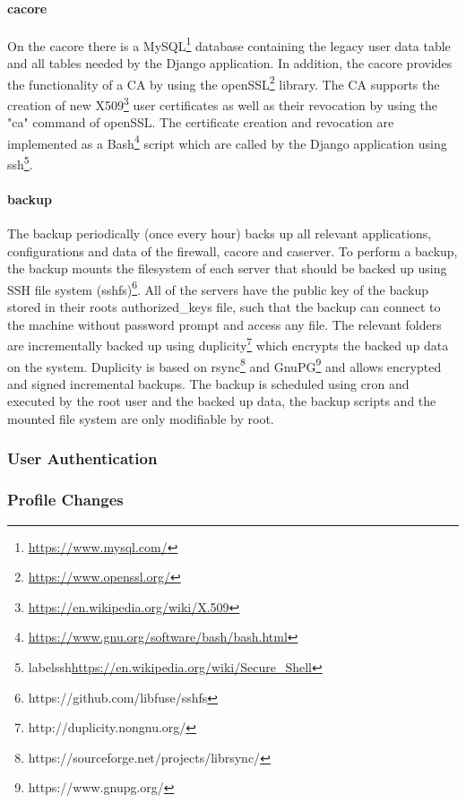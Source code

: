 \documentclass[english]{article}
\begin{document}
\paragraph{cacore}
On the cacore there is a MySQL\footnote{\url{https://www.mysql.com/}} database containing the legacy user data table and all tables needed by the Django application. In addition, the cacore provides the functionality of a CA by using the openSSL\footnote{\label{openssl}\url{https://www.openssl.org/}} library. The CA supports the creation of new X509\footnote{\url{https://en.wikipedia.org/wiki/X.509}} user certificates as well as their revocation by using the "ca" command of openSSL. The certificate creation and revocation are implemented as a Bash\footnote{\url{https://www.gnu.org/software/bash/bash.html}} script which are called by the Django application using ssh\footnote{label{ssh}\url{https://en.wikipedia.org/wiki/Secure_Shell}}.

\paragraph{backup}
The backup periodically (once every hour) backs up all relevant applications, configurations and data of the firewall, cacore and caserver. To perform a backup, the backup mounts the filesystem of each server that should be backed up using SSH file system (sshfs)\footnote{https://github.com/libfuse/sshfs}. All of the servers have the public key of the backup stored in their roots authorized\_keys file, such that the backup can connect to the machine without password prompt and access any file. The relevant folders are incrementally backed up using duplicity\footnote{http://duplicity.nongnu.org/} which encrypts the backed up data on the system. Duplicity is based on rsync\footnote{https://sourceforge.net/projects/librsync/} and GnuPG\footnote{https://www.gnupg.org/} and allows encrypted and signed incremental backups. The backup is scheduled using cron and executed by the root user and the backed up data, the backup scripts and the mounted file system are only modifiable by root.
 
 \subsubsection{User Authentication}

 \subsubsection{Profile Changes}
 
\end{document}
